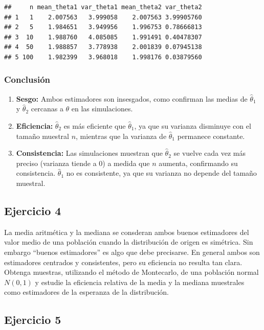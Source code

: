 \documentclass[
]{article}
\begin{document}
\begin{verbatim}
##     n mean_theta1 var_theta1 mean_theta2 var_theta2
## 1   1    2.007563   3.999058    2.007563 3.99905760
## 2   5    1.984651   3.949956    1.996753 0.78666813
## 3  10    1.988760   4.085085    1.991491 0.40478307
## 4  50    1.988857   3.778938    2.001839 0.07945138
## 5 100    1.982399   3.968018    1.998176 0.03879560
\end{verbatim}

\subsubsection{Conclusión}\label{conclusiuxf3n-5}

\begin{enumerate}
\def\labelenumi{\arabic{enumi}.}
\item
  \textbf{Sesgo:} Ambos estimadores son insesgados, como confirman las medias de \(\hat\theta_1\) y \(\hat\theta_2\) cercanas a \(\theta\) en las simulaciones.
\item
  \textbf{Eficiencia:} \(\hat\theta_2\) es más eficiente que \(\hat\theta_1\), ya que su varianza disminuye con el tamaño muestral \(n\), mientras que la varianza de \(\hat\theta_1\) permanece constante.
\item
  \textbf{Consistencia:} Las simulaciones muestran que \(\hat\theta_2\) se vuelve cada vez más preciso (varianza tiende a 0) a medida que \(n\) aumenta, confirmando su consistencia. \(\hat\theta_1\) no es consistente, ya que su varianza no depende del tamaño muestral.
\end{enumerate}

\subsection{Ejercicio 4}\label{ejercicio-4-1}

La media aritmética y la mediana se consderan ambos buenos estimadores del valor medio de una población cuando la distribución de origen es simétrica. Sin embargo ``buenos estimadores'' es algo que debe precisarse. En general ambos son estimadores centrados y consistentes, pero su eficiencia no resulta tan clara.
Obtenga muestras, utilizando el método de Montecarlo, de una población normal \(N(0,1)\) y estudie la eficiencia relativa de la media y la mediana muestrales como estimadores de la esperanza de la distribución.

\subsection{Ejercicio 5}\label{ejercicio-5-2}
\end{document}
